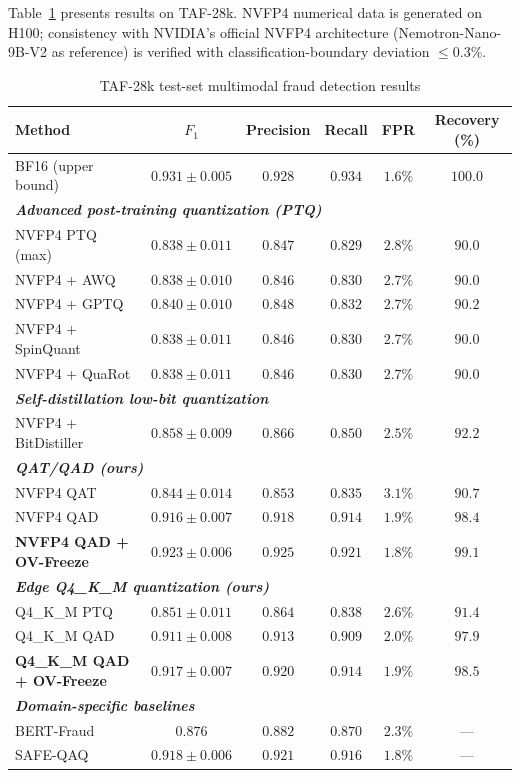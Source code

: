 \documentclass[11pt, a4paper]{article}
\begin{document}
Table~\ref{tab3-en} presents results on TAF-28k. NVFP4 numerical data is generated on H100; consistency with NVIDIA's official NVFP4 architecture (Nemotron-Nano-9B-V2 as reference) is verified with classification-boundary deviation $\le 0.3\%$.

\begin{table}[h]
\centering
\caption{TAF-28k test-set multimodal fraud detection results}
\label{tab3-en}
\small
\renewcommand{\arraystretch}{1.2}
\begin{tabularx}{\textwidth}{Xccccc}
\toprule
\textbf{Method} & \textbf{$F_1$} & \textbf{Precision} & \textbf{Recall} & \textbf{FPR} & \textbf{Recovery (\%)} \\
\midrule
BF16 (upper bound) & $0.931 \pm 0.005$ & $0.928$ & $0.934$ & $1.6\%$ & $100.0$ \\
\midrule
\multicolumn{6}{l}{\emph{\textbf{Advanced post-training quantization (PTQ)}}} \\
NVFP4 PTQ (max) & $0.838 \pm 0.011$ & $0.847$ & $0.829$ & $2.8\%$ & $90.0$ \\
NVFP4 + AWQ & $0.838 \pm 0.010$ & $0.846$ & $0.830$ & $2.7\%$ & $90.0$ \\
NVFP4 + GPTQ & $0.840 \pm 0.010$ & $0.848$ & $0.832$ & $2.7\%$ & $90.2$ \\
NVFP4 + SpinQuant & $0.838 \pm 0.011$ & $0.846$ & $0.830$ & $2.7\%$ & $90.0$ \\
NVFP4 + QuaRot & $0.838 \pm 0.011$ & $0.846$ & $0.830$ & $2.7\%$ & $90.0$ \\
\midrule
\multicolumn{6}{l}{\emph{\textbf{Self-distillation low-bit quantization}}} \\
NVFP4 + BitDistiller & $0.858 \pm 0.009$ & $0.866$ & $0.850$ & $2.5\%$ & $92.2$ \\
\midrule
\multicolumn{6}{l}{\emph{\textbf{QAT/QAD (ours)}}} \\
NVFP4 QAT & $0.844 \pm 0.014$ & $0.853$ & $0.835$ & $3.1\%$ & $90.7$ \\
NVFP4 QAD & $0.916 \pm 0.007$ & $0.918$ & $0.914$ & $1.9\%$ & $98.4$ \\
\rowcolor[gray]{0.93} \textbf{NVFP4 QAD + OV-Freeze} & $\mathbf{0.923 \pm 0.006}$ & $\mathbf{0.925}$ & $\mathbf{0.921}$ & $\mathbf{1.8\%}$ & $\mathbf{99.1}$ \\
\midrule
\multicolumn{6}{l}{\emph{\textbf{Edge Q4\_K\_M quantization (ours)}}} \\
Q4\_K\_M PTQ & $0.851 \pm 0.011$ & $0.864$ & $0.838$ & $2.6\%$ & $91.4$ \\
Q4\_K\_M QAD & $0.911 \pm 0.008$ & $0.913$ & $0.909$ & $2.0\%$ & $97.9$ \\
\rowcolor[gray]{0.93} \textbf{Q4\_K\_M QAD + OV-Freeze} & $\mathbf{0.917 \pm 0.007}$ & $\mathbf{0.920}$ & $\mathbf{0.914}$ & $\mathbf{1.9\%}$ & $\mathbf{98.5}$ \\
\midrule
\multicolumn{6}{l}{\emph{\textbf{Domain-specific baselines}}} \\
BERT-Fraud & $0.876$ & $0.882$ & $0.870$ & $2.3\%$ & --- \\
SAFE-QAQ & $0.918 \pm 0.006$ & $0.921$ & $0.916$ & $1.8\%$ & --- \\
\bottomrule
\end{tabularx}
\end{table}
\end{document}
